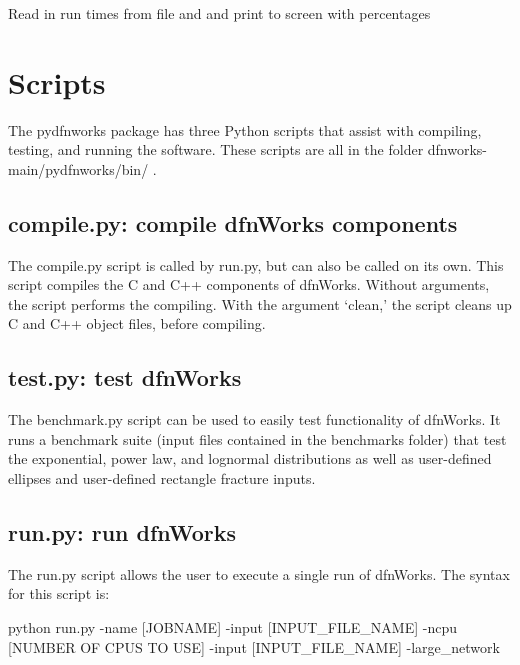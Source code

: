 \documentclass[letterpaper,10pt,english]{sphinxmanual}
\begin{document}

\begin{fulllineitems}
\label{pydfnworks:pydfnworks.helper.print_run_time}
Read in run times from file and and print to screen with percentages

\end{fulllineitems}



\chapter{Scripts}
\label{scripts:scripts}\label{scripts::doc}\label{scripts:scripts-chapter}
The pydfnworks package has three Python scripts that assist with compiling, testing, and running the software. These scripts are all in the folder dfnworks-main/pydfnworks/bin/ .


\section{compile.py: compile dfnWorks components}
\label{scripts:compile-py-compile-dfnworks-components}
The compile.py script is called by run.py, but can also be called on its own. This script compiles the C and C++ components of dfnWorks. Without arguments, the script performs the compiling. With the argument `clean,' the script cleans up C and C++ object files, before compiling.


\section{test.py: test dfnWorks}
\label{scripts:test-py-test-dfnworks}
The benchmark.py script can be used to easily test functionality of dfnWorks. It runs a benchmark suite (input files contained in the benchmarks folder) that test the exponential, power law, and lognormal distributions as well as user-defined ellipses and user-defined rectangle fracture inputs.


\section{run.py: run dfnWorks}
\label{scripts:run-py-run-dfnworks}
The run.py script allows the user to execute a single run of dfnWorks. The syntax for this script is:

python run.py -name {[}JOBNAME{]} -input {[}INPUT\_FILE\_NAME{]} -ncpu {[}NUMBER OF CPUS TO USE{]} -input {[}INPUT\_FILE\_NAME{]} -large\_network
\end{document}
